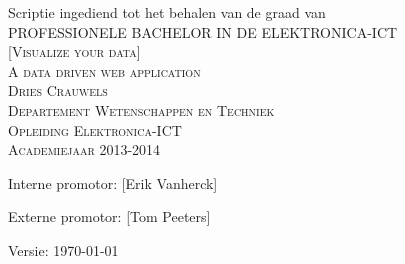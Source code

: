 
\AddToShipoutPicture*{\BackgroundPic}
\AddToShipoutPicture*{\BackgroundPicAP}

\newpage

\begin{titlepage}
 \begin{center}
\large Scriptie ingediend tot het behalen van de graad van \\[0.3cm]
\textsc{PROFESSIONELE BACHELOR IN DE ELEKTRONICA-ICT}\\[3.3cm]
\textsc{\LARGE [Visualize your data]}\\[0.3cm]
\textsc{\large A data driven web application}\\[1.3cm]
\textsc{\large Dries Crauwels}\\[0.3cm]
\textsc{\large Departement Wetenschappen en Techniek}\\[0.3cm]
\textsc{\large Opleiding Elektronica-ICT}\\[0.3cm]
\textsc{\large Academiejaar 2013-2014}\\[6.5cm]
 

\begin{minipage}{0.6\textwidth}
\begin{center} \large
Interne promotor: [Erik Vanherck]

Externe promotor: [Tom Peeters]
\end{center}
\end{minipage}

 
\vfill
 
{\large Versie: \today}
 
\end{center}
 
\end{titlepage}

